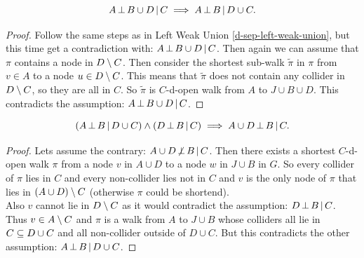 \begin{Lem} 
    \[A \operatorname*{\perp}  B \cup  D \operatorname*{|} C \implies A \operatorname*{\perp}  B \operatorname*{|} D \cup  C.\]
\begin{proof}
    Follow the same steps as in Left Weak Union \ref{d-sep-left-weak-union}, 
    but this time get a contradiction with:
    $A \operatorname*{\perp}  B \cup  D \operatorname*{|} C$.
    Then again we can assume that $\pi$ contains a node in $D \setminus C$. 
    Then consider the shortest sub-walk $\tilde \pi$ in $\pi$ from $v \in A$ to a node $u \in D \setminus C$.
    This means that $\tilde \pi$ does not contain any collider in $D\setminus C$, 
    so they are all in $C$. So $\tilde \pi$ is $C$-d-open walk from $A$ to $J \cup B \cup D$. 
    This contradicts the assumption: $A \operatorname*{\perp}  B \cup D  \operatorname*{|} C$.
\end{proof}
\end{Lem}

\begin{Lem} 
        \label{d-sep-left-contraction}
    \[ (A \operatorname*{\perp}  B \operatorname*{|} D \cup  C) \land (D \operatorname*{\perp}  B \operatorname*{|} C) \implies A \cup  D \operatorname*{\perp}  B \operatorname*{|} C.\]
\begin{proof}
    Lets assume the contrary:  $A \cup D \operatorname*{\not\perp}  B \operatorname*{|} C$.
    Then there exists a shortest $C$-d-open walk $\pi$ 
    from a node $v$ in $A \cup D$ to a node $w$ in $J \cup B$ in $G$. 
    So every collider of $\pi$ lies in $C$ and every non-collider lies not in $C$ and $v$ is 
    the only node of $\pi$ that lies in $(A \cup D) \setminus C$ (otherwise $\pi$ could be shortend). \\
    Also $v$ cannot lie in $D\setminus C$ as it would contradict the assumption: $D \operatorname*{\perp}  B \operatorname*{|} C$.
    Thus $v \in A \setminus C$ and $\pi$ is a walk from $A$ to $J \cup B$ whose colliders all lie in $C \subseteq D \cup C$ 
    and all non-collider outside of $D \cup C$.
    But this contradicts the other assumption: $A \operatorname*{\perp}  B \operatorname*{|} D \cup  C$.
\end{proof}
\end{Lem}


